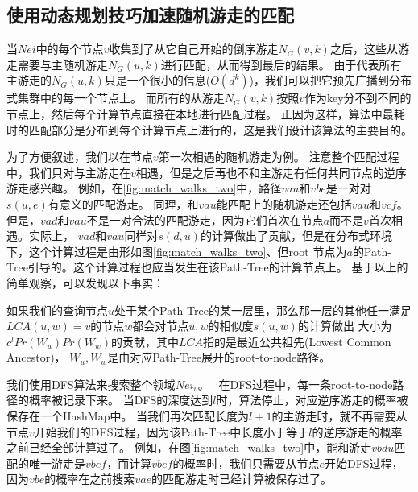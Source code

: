 \documentclass[master]{njuthesis}
\begin{document}
\subsection{使用动态规划技巧加速随机游走的匹配}
当$Nei$中的每个节点$v$收集到了从它自己开始的倒序游走$N_{G}(v, k)$之后，这些从游走需要与主随机游走$N_{G}(u, k)$进行匹配，从而得到最后的结果。
由于代表所有主游走的$N_{G}(u, k)$只是一个很小的信息($O(d^k)$)，我们可以把它预先广播到分布式集群中的每一个节点上。
而所有的从游走$N_{G}(v, k)$按照$v$作为key分不到不同的节点上，然后每个计算节点直接在本地进行匹配过程。
正因为这样，算法中最耗时的匹配部分是分布到每个计算节点上进行的，这是我们设计该算法的主要目的。

为了方便叙述，我们以在节点$v$第一次相遇的随机游走为例。
注意整个匹配过程中，我们只对与主游走在$v$相遇，但是之后再也不和主游走有任何共同节点的逆序游走感兴趣。
例如，在\ref{fig:match_walks_two}中，路径$vau$和$vbe$是一对对$s(u,e)$有意义的匹配游走。
同理，和$vau$能匹配上的随机游走还包括$vau$和$vcf$。
但是，$vad$和$vau$不是一对合法的匹配游走，因为它们首次在节点$a$而不是$v$首次相遇。实际上，
$vad$和$vau$同样对$s(d,u)$的计算做出了贡献，但是在分布式环境下，这个计算过程是由形如图\ref{fig:match_walks_two}、但root
节点为$a$的Path-Tree引导的。这个计算过程也应当发生在该Path-Tree的计算节点上。
基于以上的简单观察，可以发现以下事实：
\begin{fact}
如果我们的查询节点$u$处于某个Path-Tree的某一层里，那么那一层的其他任一满足$LCA(u, w)=v$的节点$w$都会对节点$u,w$的相似度$s(u,w)$的计算做出
大小为$c^{l}Pr(W_u)Pr(W_w)$的贡献，其中$LCA$指的是最近公共祖先(Lowest Common Ancestor)，
$W_u, W_w$是由对应Path-Tree展开的root-to-node路径。
\end{fact}
我们使用DFS算法来搜索整个领域$Nei_v$。　
在DFS过程中，每一条root-to-node路径的概率被记录下来。
当DFS的深度达到$l$时，算法停止，对应逆序游走的概率被保存在一个HashMap中。
当我们再次匹配长度为$l+1$的主游走时，就不再需要从节点$v$开始我们的DFS过程，因为该Path-Tree中长度小于等于$l$的逆序游走的概率之前已经全部计算过了。
例如，在图\ref{fig:match_walks_two}中，能和游走$vbdu$匹配的唯一游走是$vbef$，而计算$vbef$的概率时，我们只需要从节点$e$开始DFS过程，
因为$vbe$的概率在之前搜索$vae$的匹配游走时已经计算被保存过了。
\end{document}
